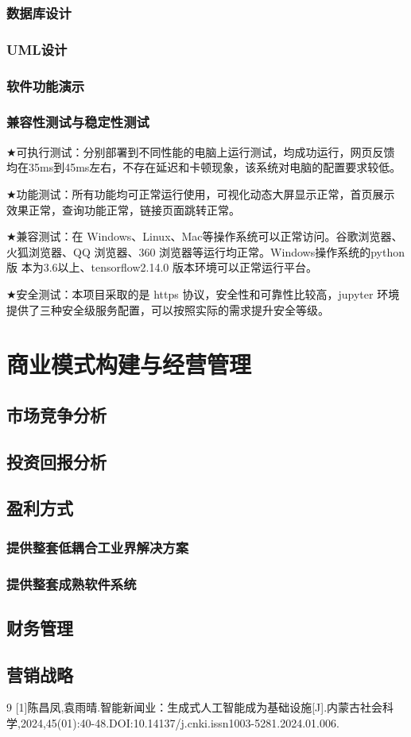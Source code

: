 \documentclass[withoutpreface,bwprint]{cumcmthesis} %
\begin{document}
	\subsubsection{ 数据库设计}
	\subsubsection{ UML设计}
	\subsubsection{ 软件功能演示}
	\subsubsection{ 兼容性测试与稳定性测试}
	$\bigstar$可执行测试：分别部署到不同性能的电脑上运行测试，均成功运行，网页反馈
	均在35ms到45ms左右，不存在延迟和卡顿现象，该系统对电脑的配置要求较低。\par
	$\bigstar$功能测试：所有功能均可正常运行使用，可视化动态大屏显示正常，首页展示
	效果正常，查询功能正常，链接页面跳转正常。\par
	$\bigstar$兼容测试：在 Windows、Linux、Mac等操作系统可以正常访问。谷歌浏览器、
	火狐浏览器、QQ 浏览器、360 浏览器等运行均正常。Windows操作系统的python版
	本为3.6以上、tensorflow2.14.0 版本环境可以正常运行平台。\par
	$\bigstar$安全测试：本项目采取的是 https 协议，安全性和可靠性比较高，jupyter 环境
	提供了三种安全级服务配置，可以按照实际的需求提升安全等级。\par
	\newpage
	\section{商业模式构建与经营管理}
	\subsection{市场竞争分析}
	\subsection{投资回报分析}
	\subsection{盈利方式}
	\subsubsection{ 提供整套低耦合工业界解决方案}
	\subsubsection{ 提供整套成熟软件系统}
	\subsection{财务管理}
	\subsection{营销战略}
	\newpage
	
	\begin{thebibliography}{9}%
		[1]陈昌凤,袁雨晴.智能新闻业：生成式人工智能成为基础设施[J].内蒙古社会科学,2024,45(01):40-48.DOI:10.14137/j.cnki.issn1003-5281.2024.01.006.
	\end{thebibliography}
	
	\newpage
\end{document}
